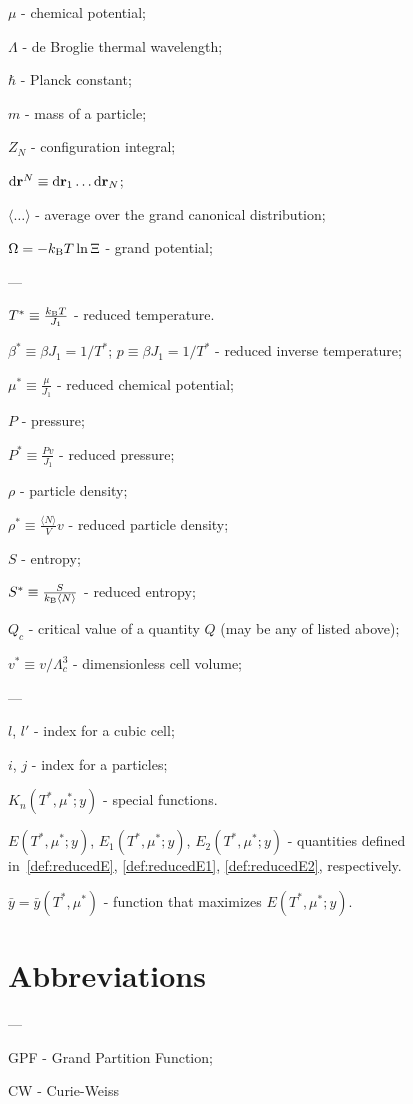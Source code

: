 $\mu$ - chemical potential;

$\Lambda$ - de Broglie thermal wavelength;

$\hbar$ - Planck constant;

$m$ - mass of a particle;

$Z_N$ - configuration integral;

${\rm d} \vb{r}^N \equiv {\rm d}{\vb r_1} \dotsc {\rm d}{\vb r_N}$;

$\langle\ldots\rangle$ - average over the grand canonical distribution;

$\Omega = -k_{\rm B}T \ln \Xi$ - grand potential;

---

$T^* \equiv \frac{k_{\rm B}T}{J_1}$ - reduced temperature.

$\beta^* \equiv \beta J_1 = 1/T^*$; $p \equiv \beta J_1 = 1/T^*$ - reduced inverse temperature;

$\mu^* \equiv \frac{\mu}{J_1}$ - reduced chemical potential;

$P$ - pressure;

$P^* \equiv \frac{Pv}{J_1}$ - reduced pressure;

$\rho$ - particle density;

$\rho^* \equiv \frac{\langle N \rangle}{V}v$ - reduced particle density;

$S$ - entropy;

$S^* \equiv \frac{S}{k_{\rm B} \langle N \rangle}$ - reduced entropy;

$Q_c$ - critical value of a quantity $Q$ (may be any of listed above);

$v^* \equiv {v}/{\Lambda_c^3}$ - dimensionless cell volume;

---

$l$, $l'$ - index for a cubic cell;

$i$, $j$ - index for a particles;


$K_n(T^*,\mu^*;y)$ - special functions.

$E(T^*,\mu^*;y)$, $E_1(T^*,\mu^*;y)$, $E_2(T^*,\mu^*;y)$ - quantities defined in~\eqref{def:reducedE}, \eqref{def:reducedE1}, \eqref{def:reducedE2}, respectively.

$\bar{y} = \bar{y}(T^*,\mu^*)$ - function that maximizes $E(T^*,\mu^*;y)$.



\section*{Abbreviations}
---

GPF - Grand Partition Function;

CW - Curie-Weiss